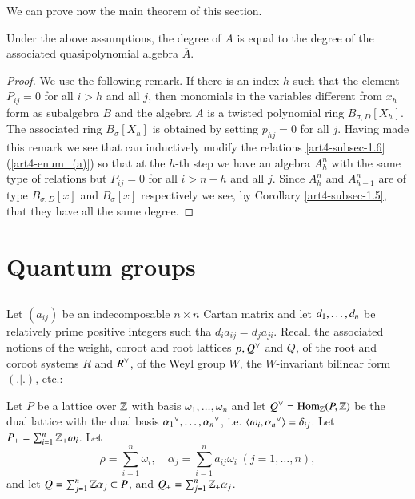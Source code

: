 We can prove now the main theorem of this section.

\begin{theorem*}
Under the above assumptions, the degree of $A$ is equal to the degree of the associated quasipolynomial algebra $\overline{A}$. 
\end{theorem*}

\begin{proof}
We use the following remark. If there is an index $h$ such that the element $P_{ij} =0$ for all $i> h$ and all $j$, then monomials in the variables different from $x_{h}$ form as subalgebra $B$ and the algebra $A$ is a twisted polynomial ring $B_{\sigma, D}[X_{h}]$. The associated ring $B_{\sigma}[X_{h}]$ is obtained by setting $p_{hj} = 0$ for all $j$. Having made this remark we see that can inductively modify the relations \ref{art4-subsec-1.6}(\ref{art4-enum_(a)}) so that at the $h$-th step we have an algebra $A_{h}^{n}$ with the same type of relations but $P_{ij} = 0$ for all $i>n-h$ and all $j$. Since $A_{h}^{n}$ and $A_{h-1}^{n}$ are of type $B_{\sigma, D}[x]$ and $B_{\sigma}[x]$ respectively we see, by Corollary \ref{art4-subsec-1.5}, that they have all the same degree. 
\end{proof}

\section{Quantum groups}

\subsection{}\label{art4-subsec-2.1}
Let $(a_{ij})$ be an indecomposable $n\times n $ Cartan matrix and let $d_{1}, \ldots,\break d_{n}$ be relatively prime positive integers such tha $d_{i}a_{ij} = d_{j}a_{ji}$. Recall the associated notions of the weight, coroot and root lattices $p,Q\spcheck$ and $Q$, of the root and coroot systems $R$ and $R\spcheck$, of the Weyl group $W$, the $W$-invariant bilinear form $(.|.)$, etc.:  

Let $P$ be a lattice over $\mathbb{Z}$ with basis $\omega_{1},\ldots, \omega_{n}$ and let $Q\spcheck = \Hom_{\bbZ}\break (P, \bbZ)$ be the dual lattice with the dual basis $\alpha_{1}{\spcheck}, \ldots, \alpha_{n}{\spcheck}$, i.e. $\langle \omega_{i}, \alpha_{n}{\spcheck}\rangle = \delta_{ij}$. Let $P_{+}= \sum_{i=1}^{n} \mathbb{Z}_{+}\omega_{i}$. Let 
 $$
 \rho = \sum\limits_{i=1}^{n} \omega_{i},\quad \alpha_{j} = \sum\limits_{i=1}^{n}a_{ij}\omega_{i}\;(j=1,\ldots, n),
$$
and let $Q=\sum_{j=1}^{n}\mathbb{Z}\alpha_{j} \subset P$, and $Q_{+} = \sum_{j=1}^{n}\mathbb{Z}_{+}\alpha_{j}$.

